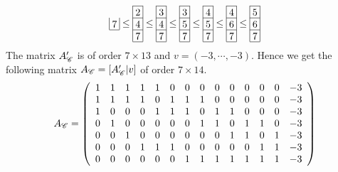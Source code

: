 \[\begin{array}[c]{*{1}c}
\lr{7}\\\cline{1-1}
\end{array}
\le
\begin{array}[c]{*{1}c}\cline{1-1}
\lr{2}\\\cline{1-1}
\lr{4}\\\cline{1-1}
\lr{7}\\\cline{1-1}
\end{array}
\le
\begin{array}[c]{*{1}c}\cline{1-1}
\lr{3}\\\cline{1-1}
\lr{4}\\\cline{1-1}
\lr{7}\\\cline{1-1}
\end{array}
\le
\begin{array}[c]{*{1}c}\cline{1-1}
\lr{3}\\\cline{1-1}
\lr{5}\\\cline{1-1}
\lr{7}\\\cline{1-1}
\end{array}
\le
\begin{array}[c]{*{1}c}\cline{1-1}
\lr{4}\\\cline{1-1}
\lr{5}\\\cline{1-1}
\lr{7}\\\cline{1-1}
\end{array}
\le
\begin{array}[c]{*{1}c}\cline{1-1}
\lr{4}\\\cline{1-1}
\lr{6}\\\cline{1-1}
\lr{7}\\\cline{1-1}
\end{array}
\le
\begin{array}[c]{*{1}c}\cline{1-1}
\lr{5}\\\cline{1-1}
\lr{6}\\\cline{1-1}
\lr{7}\\\cline{1-1}
\end{array}
\]
The matrix \(A'_{\mathscr{C}}\) is of order \(7 \times 13\) and \(v= (-3,\cdots,-3)\). Hence we get the following matrix \(A_{\mathscr{C}}=[A'_{\mathscr{C}}|v]\) of order \(7 \times 14\).
\[
A_{\mathscr{C}} = 
\left(\begin{array}{rrrrrrrrrrrrrr}
    1 & 1 & 1 & 1 & 1 & 0 & 0 & 0 & 0 & 0 & 0 & 0 & 0 & -3 \\
    1 & 1 & 1 & 1 & 0 & 1 & 1 & 1 & 0 & 0 & 0 & 0 & 0 & -3 \\
    1 & 0 & 0 & 0 & 1 & 1 & 1 & 0 & 1 & 1 & 0 & 0 & 0 & -3 \\
    0 & 1 & 0 & 0 & 0 & 0 & 0 & 1 & 1 & 0 & 1 & 1 & 0 & -3 \\
    0 & 0 & 1 & 0 & 0 & 0 & 0 & 0 & 0 & 1 & 1 & 0 & 1 & -3 \\
    0 & 0 & 0 & 1 & 1 & 1 & 0 & 0 & 0 & 0 & 0 & 1 & 1 & -3 \\
    0 & 0 & 0 & 0 & 0 & 0 & 1 & 1 & 1 & 1 & 1 & 1 & 1 & -3
\end{array}\right)
\]
